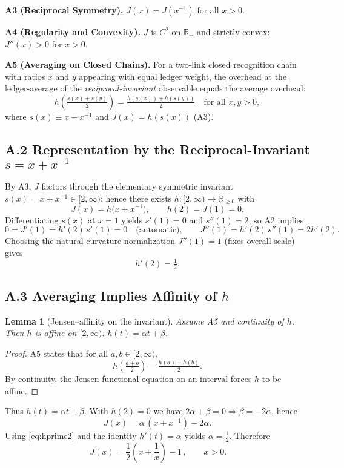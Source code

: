\documentclass[11pt]{article}
\newtheorem{lemma}[theorem]{Lemma}
\theoremstyle{definition}
\theoremstyle{remark}
\begin{document}
\noindent\textbf{A3 (Reciprocal Symmetry).}
$J(x)=J(x^{-1})$ for all $x>0$.

\noindent\textbf{A4 (Regularity and Convexity).}
$J$ is $C^2$ on $\mathbb{R}_+$ and strictly convex: $J''(x)>0$ for $x>0$.

\noindent\textbf{A5 (Averaging on Closed Chains).}
For a two-link closed recognition chain with ratios $x$ and $y$ appearing with equal ledger weight, the overhead at the ledger-average of the \emph{reciprocal-invariant} observable equals the average overhead:
\[
h\!\left(\tfrac{s(x)+s(y)}{2}\right)=\tfrac{h(s(x))+h(s(y))}{2}\quad\text{for all }x,y>0,
\]
where $s(x)\equiv x+x^{-1}$ and $J(x)=h(s(x))$ (A3).

\subsection*{A.2 Representation by the Reciprocal-Invariant $s=x+x^{-1}$}
By A3, $J$ factors through the elementary symmetric invariant $s(x)=x+x^{-1}\in[2,\infty)$; hence there exists $h:[2,\infty)\to\mathbb{R}_{\ge 0}$ with
\[
J(x)=h\!\big(x+x^{-1}\big),\qquad h(2)=J(1)=0.
\]
Differentiating $s(x)$ at $x=1$ yields $s'(1)=0$ and $s''(1)=2$, so A2 implies
\[
0=J'(1)=h'(2)\,s'(1)=0\quad\text{(automatic)},\qquad
J''(1)=h'(2)\,s''(1)=2h'(2).
\]
Choosing the natural curvature normalization $J''(1)=1$ (fixes overall scale) gives
\begin{equation}
h'(2)=\tfrac12.
\label{eq:hprime2}
\end{equation}

\subsection*{A.3 Averaging Implies Affinity of $h$}
\begin{lemma}[Jensen–affinity on the invariant]\label{lem:affine}
Assume A5 and continuity of $h$. Then $h$ is affine on $[2,\infty)$: $h(t)=\alpha t+\beta$.
\end{lemma}
\begin{proof}
A5 states that for all $a,b\in[2,\infty)$,
\[
h\!\left(\tfrac{a+b}{2}\right)=\tfrac{h(a)+h(b)}{2}.
\]
By continuity, the Jensen functional equation on an interval forces $h$ to be affine.
\end{proof}

Thus $h(t)=\alpha t+\beta$. With $h(2)=0$ we have $2\alpha+\beta=0\Rightarrow \beta=-2\alpha$, hence
\[
J(x)=\alpha\,(x+x^{-1})-2\alpha.
\]
Using \eqref{eq:hprime2} and the identity $h'(t)=\alpha$ yields $\alpha=\tfrac12$. Therefore
\begin{equation}
\boxed{\,J(x)=\frac12\!\left(x+\frac{1}{x}\right)-1\,},\qquad x>0.
\label{eq:Jfinal}
\end{equation}
\end{document}
